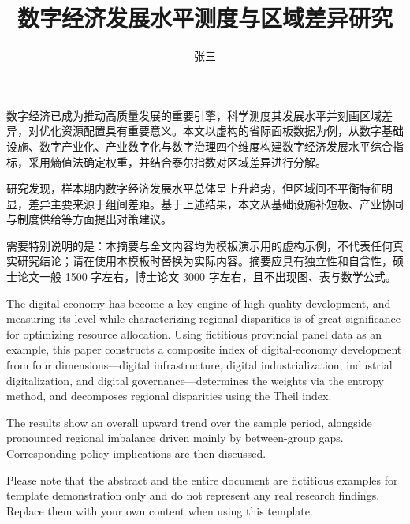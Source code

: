 \documentclass[master]{dufethesis}
\title{数字经济发展水平测度与区域差异研究}
\author{张三}
\begin{document}
\makecover

\frontmatter

\begin{cabstract}
数字经济已成为推动高质量发展的重要引擎，科学测度其发展水平并刻画区域差异，对优化资源配置具有重要意义。本文以虚构的省际面板数据为例，从数字基础设施、数字产业化、产业数字化与数字治理四个维度构建数字经济发展水平综合指标，采用熵值法确定权重，并结合泰尔指数对区域差异进行分解。

研究发现，样本期内数字经济发展水平总体呈上升趋势，但区域间不平衡特征明显，差异主要来源于组间差距。基于上述结果，本文从基础设施补短板、产业协同与制度供给等方面提出对策建议。

需要特别说明的是：本摘要与全文内容均为模板演示用的虚构示例，不代表任何真实研究结论；请在使用本模板时替换为实际内容。摘要应具有独立性和自含性，硕士论文一般 1500 字左右，博士论文 3000 字左右，且不出现图、表与数学公式。
\end{cabstract}

\begin{eabstract}
The digital economy has become a key engine of high-quality development, and measuring its level while characterizing regional disparities is of great significance for optimizing resource allocation. Using fictitious provincial panel data as an example, this paper constructs a composite index of digital-economy development from four dimensions---digital infrastructure, digital industrialization, industrial digitalization, and digital governance---determines the weights via the entropy method, and decomposes regional disparities using the Theil index.

The results show an overall upward trend over the sample period, alongside pronounced regional imbalance driven mainly by between-group gaps. Corresponding policy implications are then discussed.

Please note that the abstract and the entire document are fictitious examples for template demonstration only and do not represent any real research findings. Replace them with your own content when using this template.
\end{eabstract}

\tableofcontents

\end{document}
